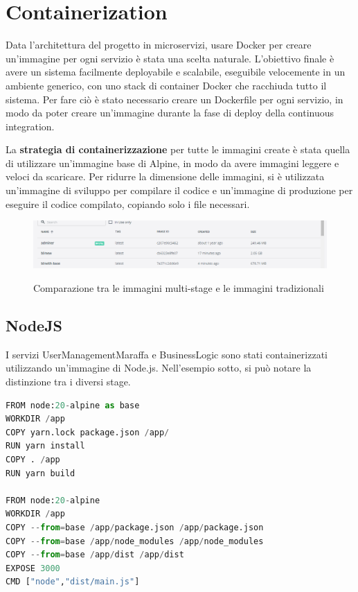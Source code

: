 \section{Containerization}

Data l'architettura del progetto in microservizi, usare Docker per creare un'immagine per ogni servizio è stata una scelta naturale. 
L'obiettivo finale è avere un sistema facilmente deployabile e scalabile, eseguibile velocemente in un ambiente generico, con uno stack di container Docker che racchiuda tutto il sistema.
Per fare ciò è stato necessario creare un Dockerfile per ogni servizio, in modo da poter creare un'immagine durante la fase di deploy della continuous integration.
\vspace{1cm}

La \textbf{strategia di containerizzazione} per tutte le immagini create è stata quella di utilizzare un'immagine base di Alpine, in modo da avere immagini leggere e veloci da scaricare. Per ridurre la dimensione delle immagini,
si è utilizzata un'immagine di sviluppo per compilare il codice e un'immagine di produzione per eseguire il codice compilato, copiando solo i file necessari.

\begin{figure}[H]
\caption{Comparazione tra le immagini multi-stage e le immagini tradizionali}
\centering
\includegraphics[width=12cm]{report/img/multi_stage.png}\\[4.5cm]
\end{figure}

\subsection{NodeJS}

I servizi UserManagementMaraffa e BusinessLogic sono stati containerizzati utilizzando un'immagine di Node.js. Nell'esempio sotto, si può notare la distinzione tra i diversi stage.
\vspace{1cm}

\begin{lstlisting}[language=Python, caption={Dockerfile delle immagini NodeJS}, label=list:dockerfile_nodejs]
FROM node:20-alpine as base
WORKDIR /app
COPY yarn.lock package.json /app/
RUN yarn install
COPY . /app
RUN yarn build

FROM node:20-alpine
WORKDIR /app    
COPY --from=base /app/package.json /app/package.json
COPY --from=base /app/node_modules /app/node_modules
COPY --from=base /app/dist /app/dist
EXPOSE 3000
CMD ["node","dist/main.js"]
\end{lstlisting}


